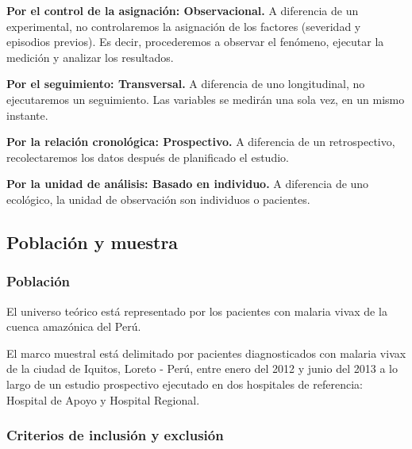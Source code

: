 \documentclass[]{article}
\begin{document}
\textbf{Por el control de la asignación: Observacional.} A diferencia de
un experimental, no controlaremos la asignación de los factores
(severidad y episodios previos). Es decir, procederemos a observar el
fenómeno, ejecutar la medición y analizar los resultados.

\textbf{Por el seguimiento: Transversal.} A diferencia de uno
longitudinal, no ejecutaremos un seguimiento. Las variables se medirán
una sola vez, en un mismo instante.

\textbf{Por la relación cronológica: Prospectivo.} A diferencia de un
retrospectivo, recolectaremos los datos después de planificado el
estudio.

\textbf{Por la unidad de análisis: Basado en individuo.} A diferencia de
uno ecológico, la unidad de observación son individuos o pacientes.

\subsection{Población y muestra}\label{poblacion-y-muestra}

\subsubsection{Población}\label{poblacion}

El universo teórico está representado por los pacientes con malaria
vivax de la cuenca amazónica del Perú.

El marco muestral está delimitado por pacientes diagnosticados con
malaria vivax de la ciudad de Iquitos, Loreto - Perú, entre enero del
2012 y junio del 2013 a lo largo de un estudio prospectivo ejecutado en
dos hospitales de referencia: Hospital de Apoyo y Hospital Regional.

\subsubsection{Criterios de inclusión y
exclusión}\label{criterios-de-inclusion-y-exclusion}
\end{document}
